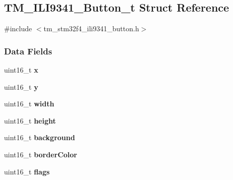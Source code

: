 \hypertarget{struct_t_m___i_l_i9341___button__t}{}\subsection{T\+M\+\_\+\+I\+L\+I9341\+\_\+\+Button\+\_\+t Struct Reference}
\label{struct_t_m___i_l_i9341___button__t}


{\ttfamily \#include $<$tm\+\_\+stm32f4\+\_\+ili9341\+\_\+button.\+h$>$}

\subsubsection*{Data Fields}
\begin{DoxyCompactItemize}
\item 
\hypertarget{struct_t_m___i_l_i9341___button__t_a4dde988b1b2adba65ae3efa69f65d960}{}uint16\+\_\+t {\bfseries x}\label{struct_t_m___i_l_i9341___button__t_a4dde988b1b2adba65ae3efa69f65d960}

\item 
\hypertarget{struct_t_m___i_l_i9341___button__t_ab0580f504a7428539be299fa71565f30}{}uint16\+\_\+t {\bfseries y}\label{struct_t_m___i_l_i9341___button__t_ab0580f504a7428539be299fa71565f30}

\item 
\hypertarget{struct_t_m___i_l_i9341___button__t_ad0eab1042455a2067c812ab8071d5376}{}uint16\+\_\+t {\bfseries width}\label{struct_t_m___i_l_i9341___button__t_ad0eab1042455a2067c812ab8071d5376}

\item 
\hypertarget{struct_t_m___i_l_i9341___button__t_a81c9f8d0b8c3b49d770be14dbe9f0d37}{}uint16\+\_\+t {\bfseries height}\label{struct_t_m___i_l_i9341___button__t_a81c9f8d0b8c3b49d770be14dbe9f0d37}

\item 
\hypertarget{struct_t_m___i_l_i9341___button__t_a976025cee677d7b63d4ff34dfc6935f3}{}uint16\+\_\+t {\bfseries background}\label{struct_t_m___i_l_i9341___button__t_a976025cee677d7b63d4ff34dfc6935f3}

\item 
\hypertarget{struct_t_m___i_l_i9341___button__t_ae54c79e4ab6c2a262113fdae98982ad1}{}uint16\+\_\+t {\bfseries border\+Color}\label{struct_t_m___i_l_i9341___button__t_ae54c79e4ab6c2a262113fdae98982ad1}

\item 
\hypertarget{struct_t_m___i_l_i9341___button__t_a1e87af3c18a2fd36c61faf89949bdc3f}{}uint16\+\_\+t {\bfseries flags}\label{struct_t_m___i_l_i9341___button__t_a1e87af3c18a2fd36c61faf89949bdc3f}


\end{DoxyCompactItemize}
